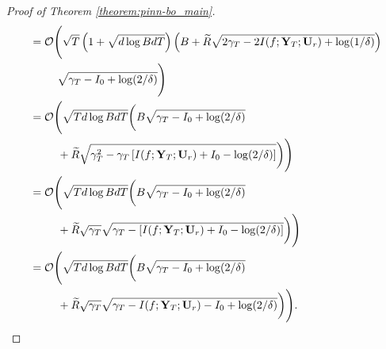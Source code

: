 \begin{proof}[Proof of Theorem \ref{theorem:pinn-bo_main}]
\begin{align*}
    &= \mathcal{O}\Bigg( \sqrt{T} \left(1 +  \sqrt{d\log BdT}\right) \left(B + \widetilde{R}\sqrt{2\gamma_T - 2I(f;\mathbf{Y}_T; \mathbf{U}_r)+\log(1/\delta)} \right) \notag 
    \\
    & \;\;\;\;\;\;\;\;\; \sqrt{\gamma_T - I_0 + \log(2/\delta)}   \Bigg) 
    \\
    &= \mathcal{O}\Bigg( \sqrt{T d\log BdT} \bigg(B \sqrt{\gamma_T - I_0 + \log(2/\delta)} 
    \\
    & \;\;\;\;\;\;\;\;\; + \widetilde{R}\sqrt{\gamma_T^2 - \gamma_T \left[I(f;\mathbf{Y}_T; \mathbf{U}_r) + I_0 -\log(2/\delta)\right]} \bigg) \Bigg) 
    \\
    &= \mathcal{O}\Bigg( \sqrt{T d\log BdT} \bigg(B \sqrt{\gamma_T - I_0 + \log(2/\delta)} \notag 
    \\
    & \;\;\;\;\;\;\;\;\; + \widetilde{R}\sqrt{\gamma_T}\sqrt{\gamma_T - \left[I(f;\mathbf{Y}_T; \mathbf{U}_r) + I_0 -\log(2/\delta)\right]} \bigg) \Bigg)
    \\
    &= \mathcal{O}\Bigg( \sqrt{T d\log BdT} \bigg(B \sqrt{\gamma_T - I_0 + \log(2/\delta)} \notag 
    \\
    & \;\;\;\;\;\;\;\;\; +  \widetilde{R}\sqrt{\gamma_T}\sqrt{\gamma_T - I(f;\mathbf{Y}_T; \mathbf{U}_r) - I_0 +\log(2/\delta)} \bigg) \Bigg).
\end{align*}
\end{proof}


